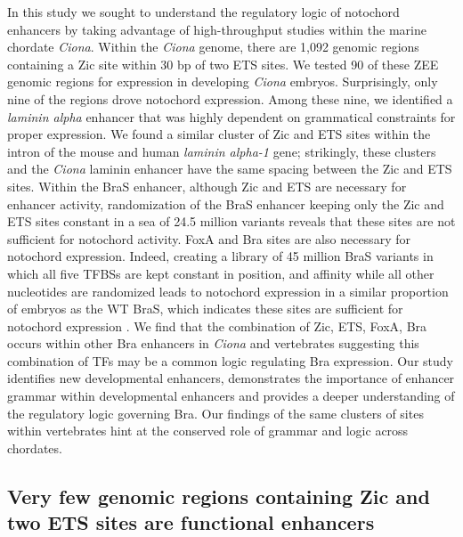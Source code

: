 In this study we sought to understand the regulatory logic of notochord enhancers by taking advantage of high-throughput studies within the marine chordate \textit{Ciona}. Within the \textit{Ciona} genome, there are 1,092 genomic regions containing a Zic site within 30 bp of two ETS sites. We tested 90 of these ZEE genomic regions for expression in developing \textit{Ciona} embryos. Surprisingly, only nine of the regions drove notochord expression. Among these nine, we identified a \textit{laminin alpha} enhancer that was highly dependent on grammatical constraints for proper expression. We found a similar cluster of Zic and ETS sites within the intron of the mouse and human \textit{laminin alpha-1} gene; strikingly, these clusters and the \textit{Ciona} laminin enhancer have the same spacing between the Zic and ETS sites. Within the BraS enhancer, although Zic and ETS are necessary for enhancer activity, randomization of the BraS enhancer keeping only the Zic and ETS sites constant in a sea of 24.5 million variants reveals that these sites are not sufficient for notochord activity. FoxA and Bra sites are also necessary for notochord expression. Indeed, creating a library of 45 million BraS variants in which all five TFBSs are kept constant in position, and affinity while all other nucleotides are randomized leads to notochord expression in a similar proportion of embryos as the WT BraS, which indicates these sites are sufficient for notochord expression . We find that the combination of Zic, ETS, FoxA, Bra occurs within other Bra enhancers in \textit{Ciona} and vertebrates suggesting this combination of TFs may be a common logic regulating Bra expression. Our study identifies new developmental enhancers, demonstrates the importance of enhancer grammar within developmental enhancers and provides a deeper understanding of the regulatory logic governing Bra. Our findings of the same clusters of sites within vertebrates hint at the conserved role of grammar and logic across chordates. 

\subsection{Very few genomic regions containing Zic and two ETS sites are functional enhancers}

